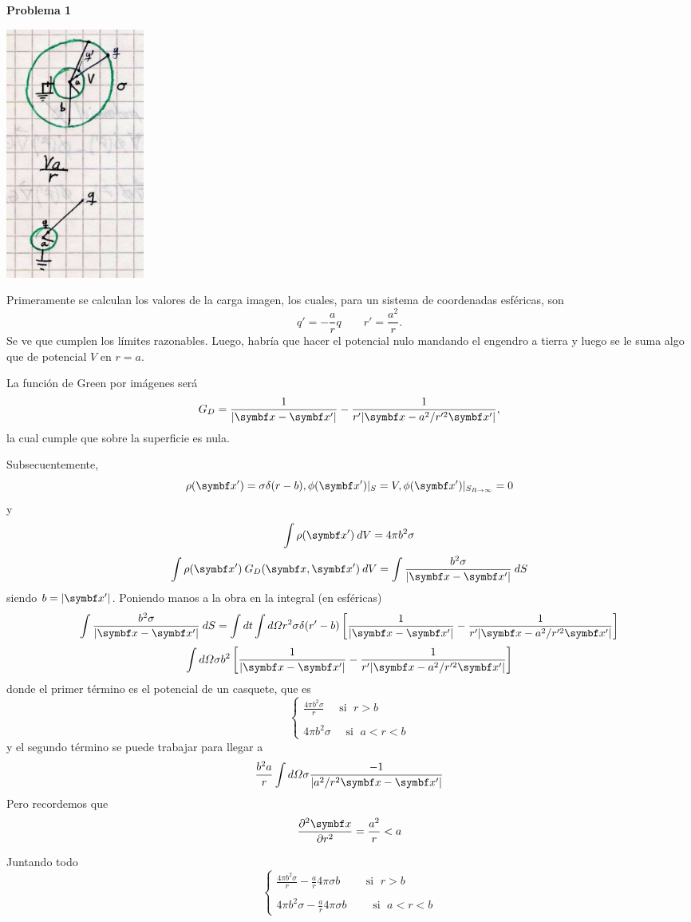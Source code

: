 \documentclass[10pt,oneside]{CBFT_book}
\begin{document}
\begin{ejemplo}{\bf Problema 1}

\includegraphics[width=0.2\textwidth]{images/fig_ft1_g1_p1_A.jpg} 

Primeramente se calculan los valores de la carga imagen, los cuales, para un
sistema de coordenadas esféricas, son
\[
	q'= -\frac{a}{r} q \qquad r'= \frac{a^2}{r}.
\]
Se ve que cumplen los límites razonables.
Luego, habría que hacer el potencial nulo mandando el engendro a tierra y luego se
le suma algo que de potencial $V$ en $r=a$.

La función de Green por imágenes será
\[
	G_D = \frac{1}{|\vbx - \vbx'|} - \frac{1}{r'|\vbx - a^2/r'^2 \vbx'|},
\]
la cual cumple que sobre la superficie es nula.

Subsecuentemente,
\[
	\rho(\vbx') = \sigma \delta(r-b), \phi(\vbx')|_S = V, \phi(\vbx')|_{S_{R\to\infty}} = 0 
\]
y
\[
	\int \rho(\vbx') \: dV = 4 \pi b^2 \sigma 
\]
\[
	\int \rho(\vbx') \: G_D( \vbx, \vbx')  \: dV = \int \frac{b^2 \sigma}{|\vbx - \vbx'|} \: dS
\]
siendo $b=|\vbx'|$. Poniendo manos a la obra en la integral (en esféricas)
\[
	\int \frac{b^2 \sigma}{|\vbx - \vbx'|} \: dS =
	\int dt \int d\Omega r^2 \sigma \delta(r'-b) 
	\left[ \frac{1}{|\vbx - \vbx'|} - \frac{1}{r'|\vbx - a^2/r'^2 \vbx'|} \right]
\]
\[
	\int d\Omega \sigma b^2
	\left[ \frac{1}{|\vbx - \vbx'|} - \frac{1}{r'|\vbx - a^2/r'^2 \vbx'|} \right]
\]
donde el primer término es el potencial de un casquete, que es 
\[
	\begin{cases}
	 \displaystyle \frac{4\pi b^2\sigma}{r} \quad \text{ si } \; r > b \\
	 \\
	 \displaystyle 4 \pi b^2 \sigma \quad \text{ si } \; a < r < b 
	\end{cases}
\]
y el segundo término se puede trabajar para llegar a
\[
	\frac{b^2 a }{r} \int d\Omega \sigma \frac{-1}{|a^2/r^2 \vbx - \vbx'|} 
\]
Pero recordemos que 
\[
	\dpar[2]{\vbx}{r} = \frac{a^2}{r} < a
\]

Juntando todo
\[
	\begin{cases}
	 \displaystyle \frac{4\pi b^2\sigma}{r} - \frac{a}{r} 4 \pi \sigma b \qquad \text{ si } \; r > b \\
	 \\
	 \displaystyle  4 \pi b^2 \sigma - \frac{a}{r} 4 \pi \sigma b \qquad \text{ si } \; a < r < b  
	\end{cases}	
\]


\end{ejemplo}
\end{document}
